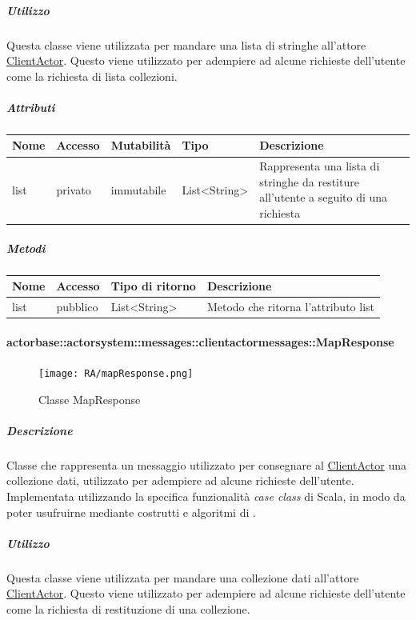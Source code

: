 \documentclass{scalatekids-article}
\begin{document}
\subparagraph{Utilizzo}
Questa classe viene utilizzata per mandare una lista di stringhe all'attore
\hyperref[sec:actorbase::actorsystem::actors::clientactor::ClientActor]{ClientActor}.
Questo viene utilizzato per adempiere ad alcune richieste dell'utente come
la richiesta di lista collezioni.

\subparagraph{Attributi}
\begin{tabular}{| p{2cm} | p{1.5cm} | p{2cm} | p{3cm} | p{8.5cm} |}
  \hline
  Nome & Accesso & Mutabilità & Tipo & Descrizione\\
  \hline
  list & privato & immutabile & List<String> & Rappresenta una lista di stringhe da restiture all'utente a seguito di una richiesta \\
  \hline
\end{tabular}

\subparagraph{Metodi}
\begin{tabular}{| p{3cm} | p{1.5cm} | p{3.5cm} | p{9cm} |}
  \hline
  Nome & Accesso & Tipo di ritorno & Descrizione\\
  \hline
  list & pubblico & List<String> & Metodo che ritorna l'attributo list\\
  \hline
\end{tabular}

\paragraph{actorbase::actorsystem::messages::clientactormessages::MapResponse}
\label{sec:actorbase::actorsystem::messages::clientactormessages::MapResponse}

\begin{figure}[H]
  \begin{center}
    \texttt{[image: RA/mapResponse.png]}
    \caption{Classe MapResponse}
  \end{center}
\end{figure}

\subparagraph{Descrizione}
Classe che rappresenta un messaggio utilizzato per consegnare al
\hyperref[sec:actorbase::actorsystem::actors::clientactor::ClientActor]{ClientActor} una collezione dati, utilizzato per adempiere ad alcune
richieste dell'utente.\\Implementata utilizzando la specifica funzionalità \textit{case class} di Scala,
in modo da poter usufruirne mediante costrutti e algoritmi di
.

\subparagraph{Utilizzo}
Questa classe viene utilizzata per mandare una collezione dati all'attore
\hyperref[sec:actorbase::actorsystem::actors::clientactor::ClientActor]{ClientActor}.
Questo viene utilizzato per adempiere ad alcune richieste dell'utente come
la richiesta di restituzione di una collezione.
\end{document}
